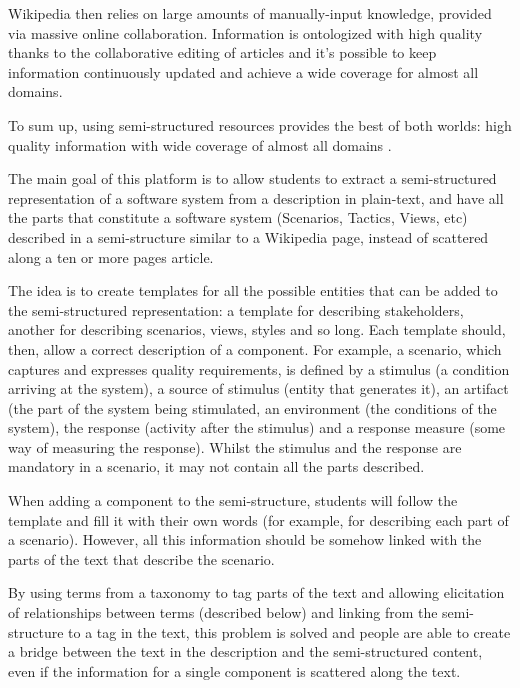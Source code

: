 Wikipedia then relies on large amounts of manually-input knowledge, provided via massive online collaboration. Information is ontologized with high quality thanks to the collaborative editing of articles and it's possible to keep information continuously updated and achieve a wide coverage for almost all domains. 

To sum up, using semi-structured resources provides the best of both worlds: high quality information with wide coverage of almost all domains \cite{hovy2013collaboratively}.

The main goal of this platform is to allow students to extract a semi-structured representation of a software system from a description in plain-text, and have all the parts that constitute a software system (Scenarios, Tactics, Views, etc) described in a semi-structure similar to a Wikipedia page, instead of scattered along a ten or more pages article. 

The idea is to create templates for all the possible entities that can be added to the semi-structured representation: a template for describing stakeholders, another for describing scenarios, views, styles and so long. Each template should, then, allow a correct description of a component. For example, a scenario, which captures and expresses quality requirements, is defined by a stimulus (a condition arriving at the system), a source of stimulus (entity that generates it), an artifact (the part of the system being stimulated, an environment (the conditions of the system), the response (activity after the stimulus) and a response measure (some way of measuring the response). Whilst the stimulus and the response are mandatory in a scenario, it may not contain all the parts described.

When adding a component to the semi-structure, students will follow the template and fill it with their own words (for example, for describing each part of a scenario). However, all this information should be somehow linked with the parts of the text that describe the scenario.

By using terms from a taxonomy to tag parts of the text and allowing elicitation of relationships between terms (described below) and linking from the semi-structure to a tag in the text, this problem is solved and people are able to create a bridge between the text in the description and the semi-structured content, even if the information for a single component is scattered along the text.  

